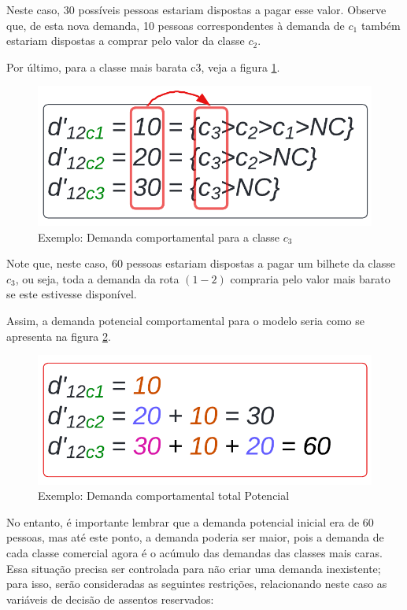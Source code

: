Neste caso, 30 possíveis pessoas estariam dispostas a pagar esse valor. Observe que, de esta nova demanda, 10 pessoas correspondentes à demanda de $c_1$ também estariam dispostas a comprar pelo valor da classe $c_2$.

Por último, para a classe mais barata c3, veja a figura \ref{fig: exemplo_dem_c3}.
\begin{figure}[!ht]
	\begin{center}
		\includegraphics[scale=0.24]{img/dem_compo_c3.png}
		\caption{Exemplo: Demanda comportamental para a classe $c_3$}
		\label{fig: exemplo_dem_c3}
	\end{center}
\end{figure}
Note que, neste caso, 60 pessoas estariam dispostas a pagar um bilhete da classe $c_3$, ou seja, toda a demanda da rota $(1-2)$ compraria pelo valor mais barato se este estivesse disponível.

Assim, a demanda potencial comportamental para o modelo seria como se apresenta na figura \ref{fig: exemplo_dem_poten}.
\begin{figure}[!ht]
	\begin{center}
		\includegraphics[scale=0.24]{img/dem_compo_poten.png}
		\caption{Exemplo: Demanda comportamental total Potencial}
		\label{fig: exemplo_dem_poten}
	\end{center}
\end{figure}
No entanto, é importante lembrar que a demanda potencial inicial era de 60 pessoas, mas até este ponto, a demanda poderia ser maior, pois a demanda de cada classe comercial agora é o acúmulo das demandas das classes mais caras. Essa situação precisa ser controlada para não criar uma demanda inexistente; para isso, serão consideradas as seguintes restrições, relacionando neste caso as variáveis de decisão de assentos reservados:

